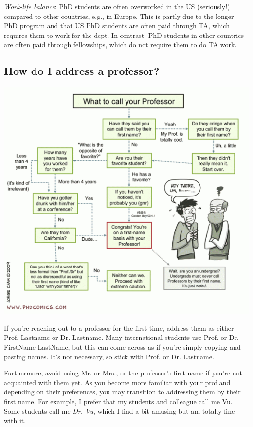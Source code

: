 \documentclass[11pt]{article}
\begin{document}
\emph{Work-life balance}: PhD students are often overworked in the US (seriously!) compared to other countries, e.g., in Europe.  This is partly due to the longer PhD program and that US PhD students are often paid through TA, which requires them to work for the dept. In contrast, PhD students in other countries are often paid through fellowships, which do not require them to do TA work.

\subsection{How do I address a professor?}

      \begin{center}
        \includegraphics[scale=0.7]{c5.png}
      \end{center}

If you're reaching out to a professor for the first time,  address them as either Prof. Lastname or Dr. Lastname. Many international students use Prof. or Dr. FirstName LastName, but this can come across as if you're simply copying and pasting names. It's not necessary, so stick with Prof. or Dr. Lastname.


Furthermore, avoid using Mr. or Mrs., or the professor's first name if you're not acquainted with them yet.  As you become more familiar with your prof and depending on their preferences, you may transition to addressing them by their first name.
For example, I prefer that my students and colleague call me Vu. Some students call me \emph{Dr. Vu}, which I find a bit amusing but am totally fine with it. 
\end{document}

